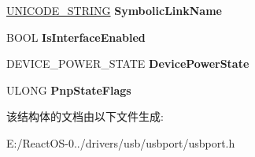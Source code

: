 \begin{DoxyCompactItemize}
\hyperlink{struct___u_n_i_c_o_d_e___s_t_r_i_n_g}{U\+N\+I\+C\+O\+D\+E\+\_\+\+S\+T\+R\+I\+NG} {\bfseries Symbolic\+Link\+Name}
\item 
\mbox{\label{struct___u_s_b_p_o_r_t___c_o_m_m_o_n___d_e_v_i_c_e___e_x_t_e_n_s_i_o_n_ac121b3a48a52e785cb19ceb836664d60}} 
B\+O\+OL {\bfseries Is\+Interface\+Enabled}
\item 
\mbox{\label{struct___u_s_b_p_o_r_t___c_o_m_m_o_n___d_e_v_i_c_e___e_x_t_e_n_s_i_o_n_a09176c3da8b0d27f2611a086507b6e87}} 
D\+E\+V\+I\+C\+E\+\_\+\+P\+O\+W\+E\+R\+\_\+\+S\+T\+A\+TE {\bfseries Device\+Power\+State}
\item 
\mbox{\label{struct___u_s_b_p_o_r_t___c_o_m_m_o_n___d_e_v_i_c_e___e_x_t_e_n_s_i_o_n_acca79317c4ffd419084f953d65aaa7a1}} 
U\+L\+O\+NG {\bfseries Pnp\+State\+Flags}
\end{DoxyCompactItemize}


该结构体的文档由以下文件生成\+:\begin{DoxyCompactItemize}
\item 
E\+:/\+React\+O\+S-\/0../drivers/usb/usbport/usbport.\+h\end{DoxyCompactItemize}
